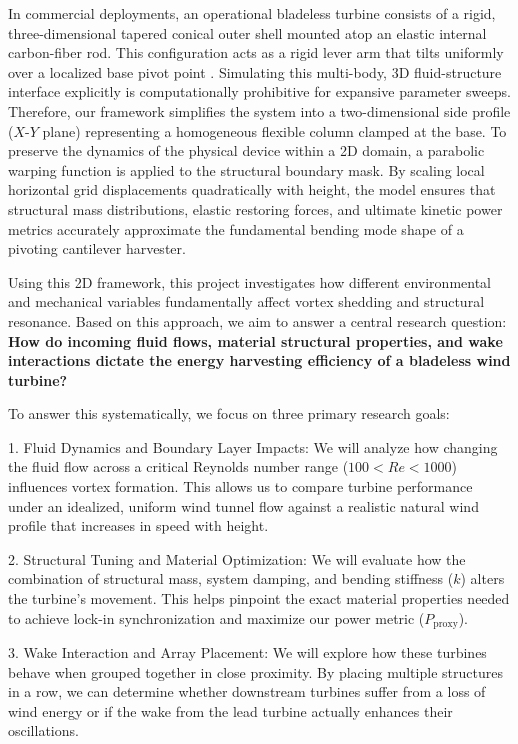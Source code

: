 \documentclass[11pt,a4paper]{article}
\begin{document}
In commercial deployments, an operational bladeless turbine consists of a rigid, three-dimensional tapered conical outer shell mounted atop an elastic internal carbon-fiber rod. This configuration acts as a rigid lever arm that tilts uniformly over a localized base pivot point \parencite{vortexbladeless2026}. Simulating this multi-body, 3D fluid-structure interface explicitly is computationally prohibitive for expansive parameter sweeps. Therefore, our framework simplifies the system into a two-dimensional side profile ($X$-$Y$ plane) representing a homogeneous flexible column clamped at the base. To preserve the dynamics of the physical device within a 2D domain, a parabolic warping function is applied to the structural boundary mask. By scaling local horizontal grid displacements quadratically with height, the model ensures that structural mass distributions, elastic restoring forces, and ultimate kinetic power metrics accurately approximate the fundamental bending mode shape of a pivoting cantilever harvester.

Using this 2D framework, this project investigates how different environmental and mechanical variables fundamentally affect vortex shedding and structural resonance. Based on this approach, we aim to answer a central research question: \textbf{How do incoming fluid flows, material structural properties, and wake interactions dictate the energy harvesting efficiency of a bladeless wind turbine?} 

To answer this systematically, we focus on three primary research goals:

1. Fluid Dynamics and Boundary Layer Impacts: We will analyze how changing the fluid flow across a critical Reynolds number range ($100 < Re < 1000$) influences vortex formation. This allows us to compare turbine performance under an idealized, uniform wind tunnel flow against a realistic natural wind profile that increases in speed with height.

2. Structural Tuning and Material Optimization: We will evaluate how the combination of structural mass, system damping, and bending stiffness ($k$) alters the turbine's movement. This helps pinpoint the exact material properties needed to achieve lock-in synchronization and maximize our power metric ($P_{\text{proxy}}$).

3. Wake Interaction and Array Placement: We will explore how these turbines behave when grouped together in close proximity. By placing multiple structures in a row, we can determine whether downstream turbines suffer from a loss of wind energy or if the wake from the lead turbine actually enhances their oscillations.
\end{document}

